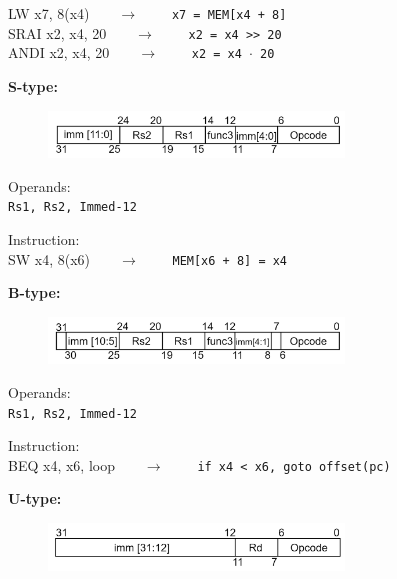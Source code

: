 \begin{description}
\begin{description}
		\textsf{LW x7, 8(x4)}\ \ \ \ $\longrightarrow$ \ \ \ \ \texttt{x7 = MEM[x4 + 8]} \\
        \textsf{SRAI x2, x4, 20}\ \ \ \ $\longrightarrow$ \ \ \ \ \texttt{x2 = x4 >> 20} \\
        \textsf{ANDI x2, x4, 20}\ \ \ \ $\longrightarrow$ \ \ \ \ \texttt{x2 = x4 $\cdot$ 20}
	\end{description}
	\item \textbf{S-type:}
  \begin{figure}[h]
    \center
    \includegraphics[width=0.7\textwidth]{sec1/images/Stype.png}
  \end{figure}
	\begin{description}
		\item Operands:\\
		\texttt{Rs1, Rs2, Immed-12}
		\item Instruction:\\
		\textsf{SW x4, 8(x6)}\ \ \ \ $\longrightarrow$ \ \ \ \ \texttt{MEM[x6 + 8] = x4}\\
	\end{description}
  \item \textbf{B-type:}
  \begin{figure}[h]
    \center
    \includegraphics[width=0.7\textwidth]{sec1/images/Btype.png}
  \end{figure}
	\begin{description}
		\item Operands:\\
		\texttt{Rs1, Rs2, Immed-12}
		\item Instruction:\\
		\textsf{BEQ x4, x6, loop}\ \ \ \ $\longrightarrow$ \ \ \ \ \texttt{if x4 < x6, goto offset(pc)}
	\end{description}
	\item \textbf{U-type:}
  \begin{figure}[h]
    \center
    \includegraphics[width=0.7\textwidth]{sec1/images/Utype.png}

\end{figure}
\end{description}
